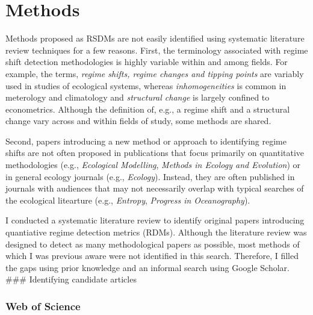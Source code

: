 \documentclass[12pt,twoside,openany]{reedthesis}
\begin{document}
\hypertarget{methods}{%
\section{Methods}\label{methods}}

Methods proposed as RSDMs are not easily identified using systematic literature review techniques for a few reasons. First, the terminology associated with regime shift detection methodologies is highly variable within and among fields. For example, the terms, \emph{regime shifts, regime changes and tipping points} are variably used in studies of ecological systems, whereas \emph{inhomogeneities} is common in meterology and climatology and \emph{structural change} is largely confined to econometrics. Although the definition of, e.g., a regime shift and a structural change vary across and within fields of study, some methods are shared.

Second, papers introducing a new method or approach to identifying regime shifts are not often proposed in publications that focus primarily on quantitative methodologies (e.g., \emph{Ecological Modelling}, \emph{Methods in Ecology and Evolution}) or in general ecology journals (e.g., \emph{Ecology}). Instead, they are often published in journals with audiences that may not necessarily overlap with typical searches of the ecological litearture (e.g., \emph{Entropy}, \emph{Progress in Oceanography}).

I conducted a systematic literature review to identify original papers introducing quantiative regime detection metrics (RDMs). Although the literature review was designed to detect as many methodological papers as possible, most methods of which I was previous aware were not identified in this search. Therefore, I filled the gaps using prior knowledge and an informal search using Google Scholar.
\#\#\# Identifying candidate articles

\hypertarget{web-of-science}{%
\subsubsection{Web of Science}\label{web-of-science}}
\end{document}
